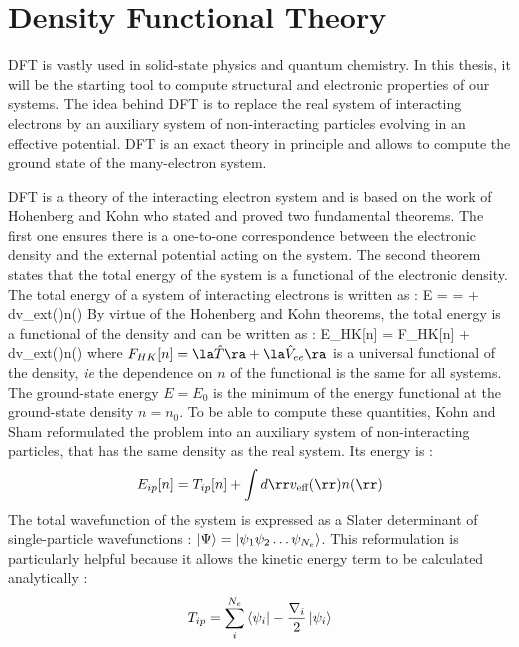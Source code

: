 \section{Density Functional Theory}
\gls{DFT} is vastly used in solid-state physics and quantum chemistry. In this thesis, it will be the starting tool to compute structural and electronic properties of our systems. The idea behind \gls{DFT} is to replace the real system of interacting electrons by an auxiliary system of non-interacting particles evolving in an effective potential. \gls{DFT} is an exact theory in principle and allows to compute the ground state of the many-electron system.

\gls{DFT} is a theory of the interacting electron system and is based on the work of Hohenberg and Kohn who stated and proved two fundamental theorems. \cite{hohenberg1964} The first one ensures there is a one-to-one correspondence between the electronic density and the external potential acting on the system. The second theorem states that the total energy of the system is a functional of the electronic density.
The total energy of a system of interacting electrons is written as :
\be
	E =  =  + \int d\rr v_{ext}(\rr)n(\rr)
\ee
By virtue of the Hohenberg and Kohn theorems, the total energy is a functional of the density and can be written as :
\be
 	E_{HK}[n] = F_{HK}[n] + \int d\rr v_{ext}(\rr)n(\rr)
	\label{eq:E_HK}
\ee
where $F_{HK}[n] = \la \hat{T} \ra + \la \hat{V}_{ee} \ra$ is a universal functional of the density, \emph{ie} the dependence on $n$ of the functional is the same for all systems. The ground-state energy $E = E_0$ is the minimum of the energy functional at the ground-state density $n=n_0$. To be able to compute these quantities, Kohn and Sham reformulated the problem into an auxiliary system of non-interacting particles, that has the same density as the real system.\cite{kohn1965} Its energy is :
\begin{equation}
	E_{ip}[n] = T_{ip}[n] + \int d\rr v_{\text{eff}}(\rr)n(\rr)
\end{equation}	
The total wavefunction of the system is expressed as a Slater determinant of single-particle wavefunctions : $\ket{\Psi} =\ket{\psi_1\psi_2 \ldots \psi_{N_e}}$. This reformulation is particularly helpful because it allows the kinetic energy term to be calculated analytically :
\begin{equation}
	T_{ip} =  \sum_i^{N_e} \bra{\psi_i}-\frac{\nabla_i}{2} \ket{\psi_i}
\end{equation}
